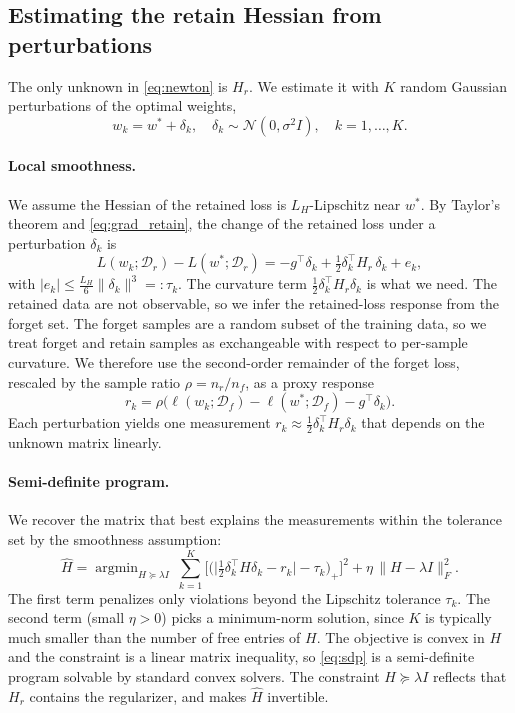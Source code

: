 \documentclass[10pt,twocolumn,letterpaper]{article}
\newcommand{\Dr}{\mathcal{D}_r}
\newcommand{\Df}{\mathcal{D}_f}
\newcommand{\Hr}{H_r}
\newcommand{\wstar}{w^{*}}
\newcommand{\norm}[1]{\lVert #1\rVert}
\begin{document}
\subsection{Estimating the retain Hessian from perturbations}
The only unknown in \cref{eq:newton} is $\Hr$. We estimate it with $K$ random Gaussian perturbations of the optimal weights,
\begin{equation}
  w_k=\wstar+\delta_k,\quad \delta_k\sim\mathcal{N}(0,\sigma^2 I),\quad k=1,\dots,K.
  \label{eq:perturb}
\end{equation}
\paragraph{Local smoothness.} We assume the Hessian of the retained loss is $L_H$-Lipschitz near $\wstar$. By Taylor's theorem and \cref{eq:grad_retain}, the change of the retained loss under a perturbation $\delta_k$ is
\begin{equation}
  L(w_k;\Dr)-L(\wstar;\Dr)=-g^\top\delta_k+\tfrac12\delta_k^\top \Hr\,\delta_k+e_k,
  \label{eq:taylor}
\end{equation}
with $|e_k|\le\tfrac{L_H}{6}\norm{\delta_k}^3=:\tau_k$. The curvature term $\tfrac12\delta_k^\top\Hr\delta_k$ is what we need. The retained data are not observable, so we infer the retained-loss response from the forget set. The forget samples are a random subset of the training data, so we treat forget and retain samples as exchangeable with respect to per-sample curvature. We therefore use the second-order remainder of the forget loss, rescaled by the sample ratio $\rho=n_r/n_f$, as a proxy response
\begin{equation}
  r_k=\rho\Big(\ell(w_k;\Df)-\ell(\wstar;\Df)-g^\top\delta_k\Big).
  \label{eq:response}
\end{equation}
Each perturbation yields one measurement $r_k\approx\tfrac12\delta_k^\top\Hr\delta_k$ that depends on the unknown matrix linearly.

\paragraph{Semi-definite program.} We recover the matrix that best explains the measurements within the tolerance set by the smoothness assumption:
\begin{equation}
  \hat H=\mathop{\arg\min}_{H\succeq \lambda I}\ \sum_{k=1}^{K}\Big[\big(\big|\tfrac12\delta_k^\top H\delta_k-r_k\big|-\tau_k\big)_+\Big]^2+\eta\,\norm{H-\lambda I}_F^2 .
  \label{eq:sdp}
\end{equation}
The first term penalizes only violations beyond the Lipschitz tolerance $\tau_k$. The second term (small $\eta>0$) picks a minimum-norm solution, since $K$ is typically much smaller than the number of free entries of $H$. The objective is convex in $H$ and the constraint is a linear matrix inequality, so \cref{eq:sdp} is a semi-definite program solvable by standard convex solvers. The constraint $H\succeq\lambda I$ reflects that $\Hr$ contains the regularizer, and makes $\hat H$ invertible.
\end{document}
